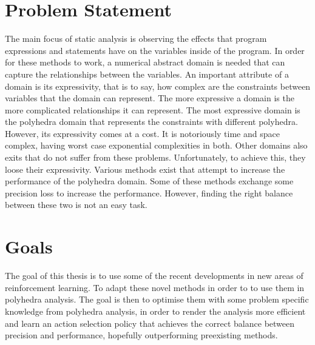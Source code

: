 \section{Problem Statement}
The main focus of static analysis is observing the effects that program expressions and statements have on the variables inside of the program. In order for these methods to work, a numerical abstract domain is needed that can capture the relationships between the variables. An important attribute of a domain is its expressivity, that is to say, how complex are the constraints between variables that the domain can represent. The more expressive a domain is the more complicated relationships it can represent. The most expressive domain is the polyhedra domain that represents the constraints with different polyhedra. However, its expressivity comes at a cost. It is notoriously time and space complex, having worst case exponential complexities in both. Other domains also exits that do not suffer from these problems. Unfortunately, to achieve this, they loose their expressivity. Various methods exist that attempt to increase the performance of the polyhedra domain. Some of these methods exchange some precision loss to increase the performance. However, finding the right balance between these two is not an easy task.

\section{Goals}
The goal of this thesis is to use some of the recent developments in new areas of reinforcement learning. To adapt these novel methods in order to to use them in polyhedra analysis. The goal is then to optimise them with some problem specific knowledge from polyhedra analysis, in order to render the analysis more efficient and learn an action selection policy that achieves the correct balance between precision and performance, hopefully outperforming preexisting methods.


